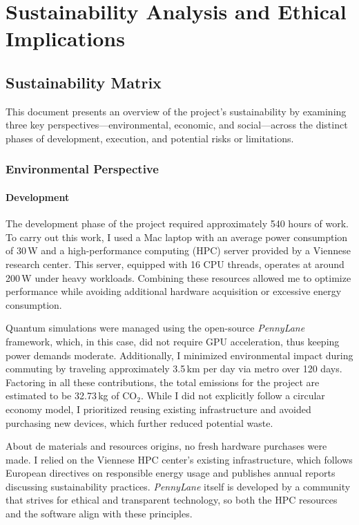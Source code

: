 \chapter{Sustainability Analysis and Ethical Implications}

\section{Sustainability Matrix}
This document presents an overview of the project’s sustainability by examining three key perspectives—environmental, economic, and social—across the distinct phases of development, execution, and potential risks or limitations.

\subsection{Environmental Perspective}

\subsubsection{Development}

The development phase of the project required approximately 540 hours of work. To carry out this work, I used a Mac laptop with an average power consumption of 30\,W and a high-performance computing (HPC) server provided by a Viennese research center. This server, equipped with 16 CPU threads, operates at around 200\,W under heavy workloads. Combining these resources allowed me to optimize performance while avoiding additional hardware acquisition or excessive energy consumption.

Quantum simulations were managed using the open-source \emph{PennyLane} framework, which, in this case, did not require GPU acceleration, thus keeping power demands moderate. Additionally, I minimized environmental impact during commuting by traveling approximately 3.5\,km per day via metro over 120 days. Factoring in all these contributions, the total emissions for the project are estimated to be 32.73\,kg of CO\(_2\). While I did not explicitly follow a circular economy model, I prioritized reusing existing infrastructure and avoided purchasing new devices, which further reduced potential waste.

About de materials and resources origins, no fresh hardware purchases were made. I relied on the Viennese HPC center’s existing infrastructure, which follows European directives on responsible energy usage and publishes annual reports discussing sustainability practices. \emph{PennyLane} itself is developed by a community that strives for ethical and transparent technology, so both the HPC resources and the software align with these principles.

